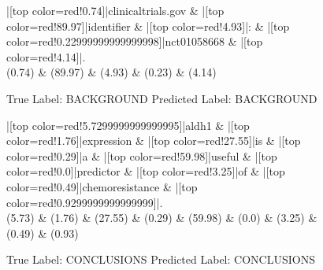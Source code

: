 \documentclass[a4paper, landscape]{article}
\begin{document}
\clearpage
\begin{figure}
\begin{center}
\begin{dependency}
\begin{deptext}
|[top color=red!0.74]|clinicaltrials.gov \& |[top color=red!89.97]|identifier \& |[top color=red!4.93]|: \& |[top color=red!0.22999999999999998]|nct01058668 \& |[top color=red!4.14]|.\\
(0.74) \& (89.97) \& (4.93) \& (0.23) \& (4.14)\\
\end{deptext}
\end{dependency}
\end{center}
\caption{True Label: BACKGROUND Predicted Label: BACKGROUND}
\end{figure}
\clearpage
\begin{figure}
\begin{center}
\begin{dependency}
\begin{deptext}
|[top color=red!5.7299999999999995]|aldh1 \& |[top color=red!1.76]|expression \& |[top color=red!27.55]|is \& |[top color=red!0.29]|a \& |[top color=red!59.98]|useful \& |[top color=red!0.0]|predictor \& |[top color=red!3.25]|of \& |[top color=red!0.49]|chemoresistance \& |[top color=red!0.9299999999999999]|.\\
(5.73) \& (1.76) \& (27.55) \& (0.29) \& (59.98) \& (0.0) \& (3.25) \& (0.49) \& (0.93)\\
\end{deptext}
\end{dependency}
\end{center}
\caption{True Label: CONCLUSIONS Predicted Label: CONCLUSIONS}
\end{figure}
\clearpage
\end{document}
